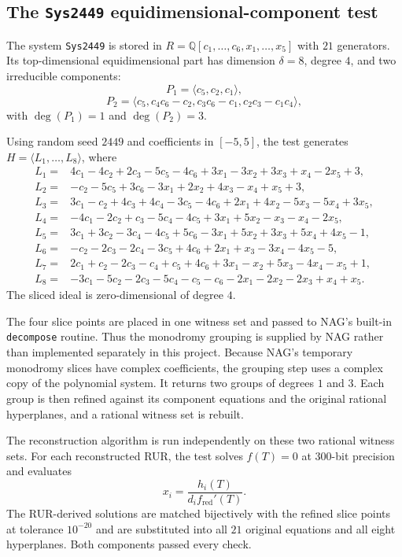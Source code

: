 \documentclass{weeklyprogress}
\begin{document}
\clearpage

\subsection{The \texttt{Sys2449} equidimensional-component test}

The system \texttt{Sys2449} is stored in
$R=\mathbb{Q}[c_1,\ldots,c_6,x_1,\ldots,x_5]$ with $21$ generators.  Its
top-dimensional equidimensional part has dimension $\delta=8$, degree $4$,
and two irreducible components:
\[
 P_1=\langle c_5,c_2,c_1\rangle,
\]
\[
 P_2=\langle c_5,c_4c_6-c_2,c_3c_6-c_1,
 c_2c_3-c_1c_4\rangle,
\]
with $\deg(P_1)=1$ and $\deg(P_2)=3$.

Using random seed $2449$ and coefficients in $[-5,5]$, the test generates
$H=\langle L_1,\ldots,L_8\rangle$, where
{\small
\begin{align*}
 L_1={}&4c_1-4c_2+2c_3-5c_5-4c_6
       +3x_1-3x_2+3x_3+x_4-2x_5+3,\\
 L_2={}&-c_2-5c_5+3c_6-3x_1+2x_2+4x_3-x_4+x_5+3,\\
 L_3={}&3c_1-c_2+4c_3+4c_4-3c_5-4c_6
       +2x_1+4x_2-5x_3-5x_4+3x_5,\\
 L_4={}&-4c_1-2c_2+c_3-5c_4-4c_5
       +3x_1+5x_2-x_3-x_4-2x_5,\\
 L_5={}&3c_1+3c_2-3c_4-4c_5+5c_6
       -3x_1+5x_2+3x_3+5x_4+4x_5-1,\\
 L_6={}&-c_2-2c_3-2c_4-3c_5+4c_6
       +2x_1+x_3-3x_4-4x_5-5,\\
 L_7={}&2c_1+c_2-2c_3-c_4+c_5+4c_6
       +3x_1-x_2+5x_3-4x_4-x_5+1,\\
 L_8={}&-3c_1-5c_2-2c_3-5c_4-c_5-c_6
       -2x_1-2x_2-2x_3+x_4+x_5.
\end{align*}
}
The sliced ideal is zero-dimensional of degree $4$.

The four slice points are placed in one witness set and passed to NAG's
built-in \verb|decompose| routine.  Thus the monodromy grouping is supplied
by NAG rather than implemented separately in this project.  Because NAG's
temporary monodromy slices have complex coefficients, the grouping step uses
a complex copy of the polynomial system.  It returns two groups of degrees
$1$ and $3$.  Each group is then refined against its component equations and
the original rational hyperplanes, and a rational witness set is rebuilt.

The reconstruction algorithm is run independently on these two rational
witness sets.  For each reconstructed RUR, the test solves $f(T)=0$ at
$300$-bit precision and evaluates
\[
 x_i=\frac{h_i(T)}{d_i f_{\mathrm{red}}'(T)}.
\]
The RUR-derived solutions are matched bijectively with the refined slice
points at tolerance $10^{-20}$ and are substituted into all $21$ original
equations and all eight hyperplanes.  Both components passed every check.
\end{document}
